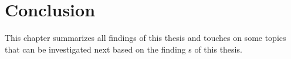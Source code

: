 \chapter{Conclusion}

This chapter summarizes all findings of this thesis and touches on some topics that can be investigated next based on the finding s of this thesis.



